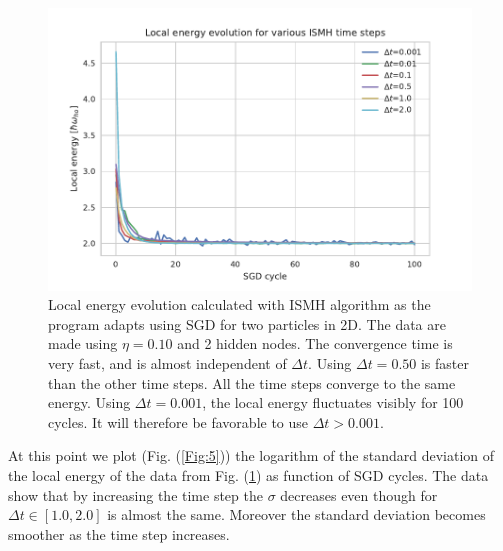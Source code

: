 \begin{figure}[ht]
\centering
\includegraphics[scale=1.0]{plot4.pdf}
\caption{Local energy evolution calculated with ISMH algorithm as the program adapts using SGD for two particles in 2D. The data are made using $\eta = 0.10$ and 2 hidden nodes. The convergence time is very fast, and is almost independent of $\Delta t$. Using $\Delta t=0.50$ is faster than the other time steps. All the time steps converge to the same energy. Using $\Delta t = 0.001$, the local energy fluctuates visibly for 100 cycles. It will therefore be favorable to use $\Delta t > 0.001$.}
\label{Fig:4}
\end{figure}
At this point we plot (Fig. (\ref{Fig:5})) the logarithm of the standard deviation of the local energy of the data from Fig. (\ref{Fig:4}) as function of SGD cycles. The data show that by increasing the time step the $\sigma$ decreases even though for $\Delta t\in [1.0, 2.0]$ is almost the same. Moreover the standard deviation becomes smoother as the time step increases. 

